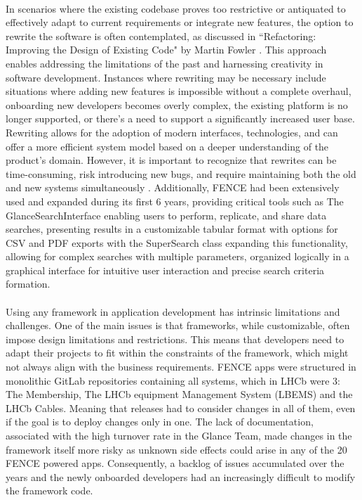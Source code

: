 \paragraph{} In scenarios where the existing codebase proves too restrictive or antiquated to effectively adapt to current requirements or integrate new features, the option to rewrite the software is often contemplated, as discussed in ``Refactoring: Improving the Design of Existing Code" by Martin Fowler \cite{fowler2019refactoring}. This approach enables addressing the limitations of the past and harnessing creativity in software development. Instances where rewriting may be necessary include situations where adding new features is impossible without a complete overhaul, onboarding new developers becomes overly complex, the existing platform is no longer supported, or there's a need to support a significantly increased user base. Rewriting allows for the adoption of modern interfaces, technologies, and can offer a more efficient system model based on a deeper understanding of the product's domain. However, it is important to recognize that rewrites can be time-consuming, risk introducing new bugs, and require maintaining both the old and new systems simultaneously \cite{kim2014refactoring}. Additionally, FENCE had been extensively used and expanded during its first 6 years, providing critical tools such as The GlanceSearchInterface enabling users to perform, replicate, and share data searches, presenting results in a customizable tabular format with options for CSV and PDF exports with the SuperSearch class expanding this functionality, allowing for complex searches with multiple parameters, organized logically in a graphical interface for intuitive user interaction and precise search criteria formation.

\paragraph{} Using any framework in application development has intrinsic limitations and challenges. One of the main issues is that frameworks, while customizable, often impose design limitations and restrictions. This means that developers need to adapt their projects to fit within the constraints of the framework, which might not always align with the business requirements. FENCE apps were structured in monolithic GitLab repositories containing all systems, which in LHCb were 3: The Membership, The LHCb equipment Management System (LBEMS) and the LHCb Cables. Meaning that releases had to consider changes in all of them, even if the goal is to deploy changes only in one. The lack of documentation, associated with the high turnover rate in the Glance Team, made changes in the framework itself more risky as unknown side effects could arise in any of the 20 FENCE powered apps. Consequently, a backlog of issues accumulated over the years and the newly onboarded developers had an increasingly difficult to modify the framework code.

